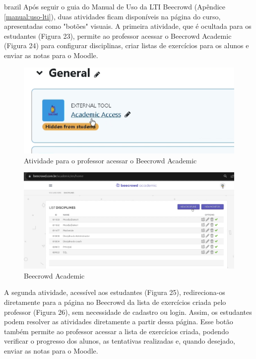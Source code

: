 \begin{otherlanguage*}{brazil}
Após seguir o guia do Manual de Uso da LTI Beecrowd (Apêndice \ref{manual:uso-lti}), duas atividades ficam disponíveis na página do curso, apresentadas como "botões" visuais. A primeira atividade, que é ocultada para os estudantes (Figura 23), permite ao professor acessar o Beecrowd Academic (Figura 24) para configurar disciplinas, criar listas de exercícios para os alunos e enviar as notas para o Moodle.

\begin{figure}[H]
    \centering
            \caption{Atividade para o professor acessar o Beecrowd Academic}
            \label{fig:ModeloConceitual}
        \includegraphics[scale=0.35]{pictures/apendices/apendice_b_5.png}
\end{figure}

\begin{figure}[H]
    \centering
            \caption{Beecrowd Academic}
            \label{fig:ModeloConceitual}
        \includegraphics[scale=0.38]{pictures/desenvolvimento/lti_beecrowd_academic.png}
\end{figure}

A segunda atividade, acessível aos estudantes (Figura 25), redireciona-os diretamente para a página no Beecrowd da lista de exercícios criada pelo professor (Figura 26), sem necessidade de cadastro ou login. Assim, os estudantes podem resolver as atividades diretamente a partir dessa página. Esse botão também permite ao professor acessar a lista de exercícios criada, podendo verificar o progresso dos alunos, as tentativas realizadas e, quando desejado, enviar as notas para o Moodle.


\end{otherlanguage*}
